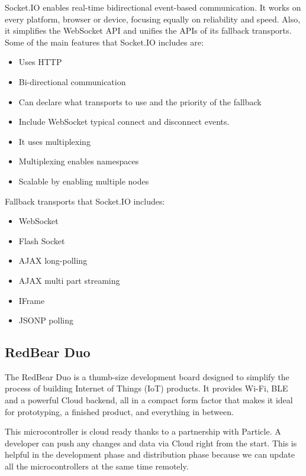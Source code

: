 \documentclass[12pt]{article}
\begin{document}
Socket.IO enables real-time bidirectional event-based communication\cite{Rauch2014}. It works on every platform, browser or device, focusing equally on reliability and speed. Also, it simplifies the WebSocket API and unifies the APIs of its fallback transports. Some of the main features that Socket.IO includes are:

\begin{itemize}
  \item Uses HTTP
  \item Bi-directional communication
  \item Can declare what transports to use and the priority of the fallback
  \item Include WebSocket typical connect and disconnect events.
  \item It uses multiplexing
  \item Multiplexing enables namespaces
  \item Scalable by enabling multiple nodes
\end{itemize}


Fallback transports that Socket.IO includes\cite{Kelleher2014}:

\begin{itemize}
  \item WebSocket
  \item Flash Socket
  \item AJAX long-polling
  \item AJAX multi part streaming
  \item IFrame
  \item JSONP polling
\end{itemize}

\subsection{RedBear Duo}

The RedBear Duo is a thumb-size development board designed to simplify the process of building Internet of Things (IoT) products. It provides Wi-Fi, BLE and a powerful Cloud backend, all in a compact form factor that makes it ideal for prototyping, a finished product, and everything in between\cite{Labs2016}.

This microcontroller is cloud ready thanks to a partnership with Particle. A developer can push any changes and data via Cloud right from the start. This is helpful in the development phase and distribution phase because we can update all the microcontrollers at the same time remotely.
\end{document}
